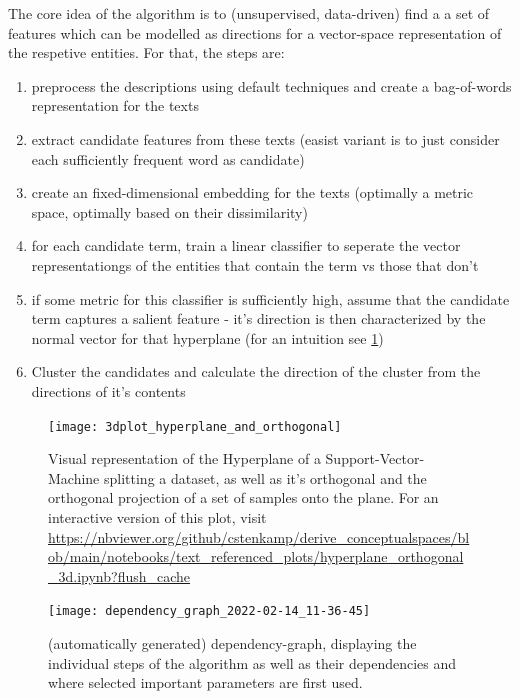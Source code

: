 The core idea of the algorithm is to (unsupervised, data-driven) find a a set of features which can be modelled as directions for a vector-space representation of the respetive entities. For that, the steps are:
\begin{enumerate}
	\item preprocess the descriptions using default techniques and create a bag-of-words representation for the texts
	\item extract candidate features from these texts (easist variant is to just consider each sufficiently frequent word as candidate)
	\item create an fixed-dimensional embedding for the texts (optimally a metric space, optimally based on their dissimilarity)
	\item for each candidate term, train a linear classifier to seperate the vector representationgs of the entities that contain the term vs those that don't
	\item if some metric for this classifier is sufficiently high, assume that the candidate term captures a salient feature - it's direction is then characterized by the normal vector for that hyperplane (for an intuition see \ref{fig:3d_hyperplane_ortho})
	\item Cluster the candidates and calculate the direction of the cluster from the directions of it's contents
\end{enumerate}

\begin{figure}
	\begin{center}
	  \texttt{[image: 3dplot\_hyperplane\_and\_orthogonal]}
	  \caption[Visual representation of the Hyperplane of an SVM splitting a dataset]{ \label{fig:3d_hyperplane_ortho} Visual representation of the Hyperplane of a Support-Vector-Machine splitting a dataset, as well as it's orthogonal and the orthogonal projection of a set of samples onto the plane. For an interactive version of this plot, visit  {\small \url{https://nbviewer.org/github/cstenkamp/derive_conceptualspaces/blob/main/notebooks/text_referenced_plots/hyperplane_orthogonal_3d.ipynb?flush_cache}}}
	\end{center}
\end{figure}

\begin{figure}[htp]
	\begin{center}
	  \texttt{[image: dependency\_graph\_2022-02-14\_11-36-45]}
	  \caption[Dependency-Graph of the Algorithm]{(automatically generated) dependency-graph, displaying the individual steps of the algorithm as well as their dependencies and where selected important parameters are first used.}
	  \label{fig:depdendency_graph}
	\end{center}
\end{figure}

